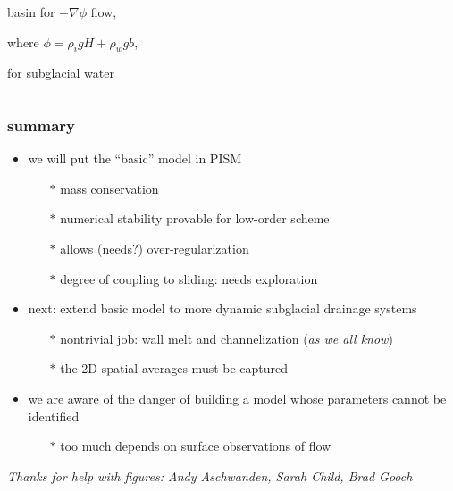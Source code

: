 \documentclass[hide notes,intlimits]{beamer}
\begin{document}
\begin{frame}
\begin{columns}
\begin{column}{0.5\textwidth}
\begin{center}
basin for $-\nabla \phi$ flow,

where $\phi = \rho_i g H + \rho_w g b$,

for subglacial water
\end{center}
\end{column}
\end{columns}

\end{frame}


{
} 


\begin{frame}
  \frametitle{summary}

  \begin{itemize}
  \item we will put the ``basic'' model in PISM
    \begin{itemize}
    \small
    \item[$\ast$] mass conservation
    \item[$\ast$] numerical stability provable for low-order scheme
    \item[$\ast$] allows (needs?) over-regularization
    \item[$\ast$] degree of coupling to sliding: needs exploration
    \end{itemize}
    \normalsize
  \item next: extend basic model to more dynamic subglacial drainage systems
    \begin{itemize}
    \small
    \item[$\ast$] nontrivial job: wall melt and channelization (\emph{as we all know})
    \item[$\ast$] the 2D spatial averages must be captured
    \end{itemize}
    \normalsize
  \item we are aware of the danger of building a model whose parameters cannot be identified
    \begin{itemize}
    \small
    \item[$\ast$] too much depends on surface observations of flow
    \end{itemize}
    \normalsize
  \end{itemize}

\vspace{17mm}
  \begin{center}
  \tiny \emph{Thanks for help with figures: Andy Aschwanden, Sarah Child, Brad Gooch}
  \end{center}
\end{frame}
\end{document}
